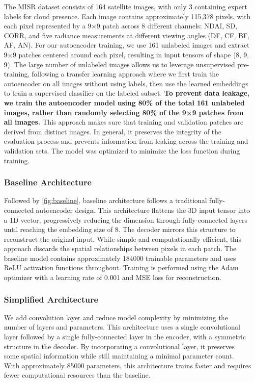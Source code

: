 \documentclass[10pt,letterpaper]{article}
\begin{document}
The MISR dataset consists of 164 satellite images, with only 3 containing expert labels for cloud presence. Each image contains approximately 115,378 pixels, with each pixel represented by a 9×9 patch across 8 different channels: NDAI, SD, CORR, and five radiance measurements at different viewing angles (DF, CF, BF, AF, AN).
For our autoencoder training, we use 161 unlabeled images and extract 9×9 patches centered around each pixel, resulting in input tensors of shape (8, 9, 9). The large number of unlabeled images allows us to leverage unsupervised pre-training, following a transfer learning approach where we first train the autoencoder on all images without using labels, then use the learned embeddings to train a supervised classifier on the labeled subset. \textbf{To prevent data leakage, we train the autoencoder model using 80\% of the total 161 unlabeled images, rather than randomly selecting 80\% of the 9×9 patches from all images.} This approach makes sure that training and validation patches are derived from distinct images. In general, it preserves the integrity of the evaluation process and prevents information from leaking across the training and validation sets. The model was optimized to minimize the loss function during training.

\subsubsection{Baseline Architecture}

Followed by \ref{fig:baseline}, baseline architecture follows a traditional fully-connected autoencoder design. This architecture flattens the 3D input tensor into a 1D vector, progressively reducing the dimension through fully-connected layers until reaching the embedding size of 8. The decoder mirrors this structure to reconstruct the original input. While simple and computationally efficient, this approach discards the spatial relationships between pixels in each patch.
The baseline model contains approximately 184000 trainable parameters and uses ReLU activation functions throughout. Training is performed using the Adam optimizer with a learning rate of 0.001 and MSE loss for reconstruction.

\subsubsection{Simplified Architecture}

We add convolution layer and reduce model complexity by minimizing the number of layers and parameters. This architecture uses a single convolutional layer followed by a single fully-connected layer in the encoder, with a symmetric structure in the decoder. By incorporating a convolutional layer, it preserves some spatial information while still maintaining a minimal parameter count. With approximately 85000 parameters, this architecture trains faster and requires fewer computational resources than the baseline.
\end{document}
